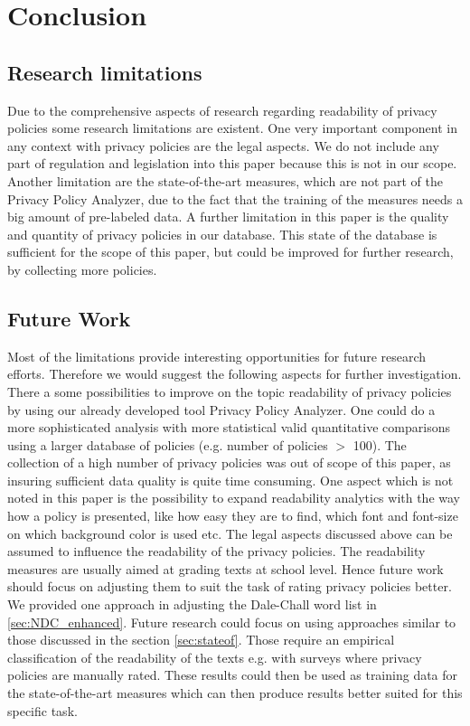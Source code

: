 \documentclass[runningheads,a4paper]{llncs}
\begin{document}
\section{Conclusion}\label{sec:conclusion}

\subsection{Research limitations}%
Due to the comprehensive aspects of research regarding readability of privacy policies some research limitations are existent. 
One very important component in any context with privacy policies are the legal aspects. We do not include any part of regulation and legislation into this paper because this is not in our scope. Another limitation are the state-of-the-art measures, which are not part of the Privacy Policy Analyzer, due to the fact that the training of the measures needs a big amount of pre-labeled data. A further limitation in this paper is the quality and quantity of privacy policies in our database. This state of the database is sufficient for the scope of this paper, but could be improved for further research, by collecting more policies.

\subsection{Future Work}
Most of the limitations provide interesting opportunities for future research efforts. Therefore we would suggest the following aspects for further investigation. 
There a some possibilities to improve on the topic readability of privacy policies by using our already developed tool Privacy Policy Analyzer. One could do a more sophisticated analysis with more statistical valid quantitative comparisons using a larger database of policies (e.g. number of policies $>$ 100). The collection of a high number of privacy policies was out of scope of this paper, as insuring sufficient data quality is quite time consuming. 
One aspect which is not noted in this paper is the possibility to expand readability analytics with the way how a policy is presented, like how easy they are to find, which font and font-size on which background color is used etc.
The legal aspects discussed above can be assumed to influence the readability of the privacy policies. The readability measures are usually aimed at grading texts at school level. Hence future work should focus on adjusting them to suit the task of rating privacy policies better. We provided one approach in adjusting the Dale-Chall word list in \ref{sec:NDC_enhanced}. Future research could focus on using approaches similar to those discussed in the section \ref{sec:stateof}. Those require an empirical classification of the readability of the texts e.g. with surveys where privacy policies are manually rated. These results could then be used as training data for the state-of-the-art measures which can then produce results better suited for this specific task.
 
\end{document}
